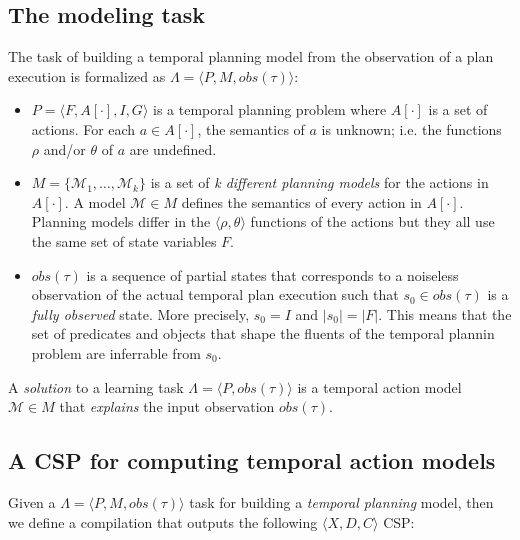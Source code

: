 \documentclass[letterpaper]{article} %
\newcommand{\tup}[1]{{\langle #1 \rangle}}
\begin{document}
\subsection{The modeling task}
The task of building a temporal planning model from the observation of a plan execution is formalized as $\Lambda=\tup{P,M,obs(\tau)}$:
\begin{itemize}
\item $P=\tup{F,A[\cdot],I,G}$ is a temporal planning problem where $A[\cdot]$ is a set of actions. For each $a\in A[\cdot]$, the semantics of $a$ is unknown; i.e. the functions $\rho$ and/or $\theta$ of $a$ are undefined.
\item $M=\{\mathcal{M}_1,\ldots,\mathcal{M}_k\}$ is a set of {\em k different planning models} for the actions in $A[\cdot]$. A model $\mathcal{M}\in M$ defines the semantics of every action in $A[\cdot]$. Planning models differ in the $\tup{\rho,\theta}$ functions of the actions but they all use the same set of state variables $F$.
\item $obs(\tau)$ is a sequence of partial states that corresponds to a noiseless observation of the actual temporal plan execution such that $s_0\in obs(\tau)$ is a {\em fully observed} state. More precisely, $s_0=I$ and $|s_0|=|F|$. This means that the set of predicates and objects that shape the fluents of the temporal plannin problem are inferrable from $s_0$. 
\end{itemize}

A {\em solution} to a learning task $\Lambda=\tup{P,obs(\tau)}$ is a temporal action model $\mathcal{M}\in M$ that {\em explains} the input observation $obs(\tau)$.

\subsection{A CSP for computing temporal action models}
Given a $\Lambda=\tup{P,M,obs(\tau)}$ task for building a {\em temporal planning} model, then we define a compilation that outputs the following $\tup{X,D,C}$ CSP:
\end{document}
